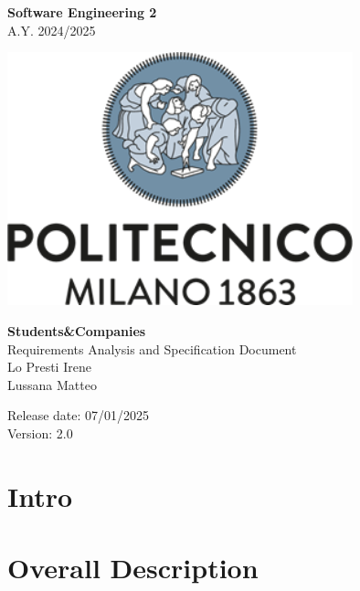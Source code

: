 \documentclass{config/PoliMi3i_thesis}
\numberwithin{algorithm}{chapter}
\begin{document}
%
\fancyhf{} %
\fancyhead[RO,RE]{\thepage} %

\begin{titlepage}

\centering
{\bfseries\LARGE Software Engineering 2\\ 
\vskip0.2cm
}
 \large A.Y. 2024/2025


\vskip1.5cm


\includegraphics[width=10cm]{Images/logopoliazzurro.png}\centering
\vskip2cm

     
\centering
{\bfseries \Huge Students\&Companies\\
\vskip0.5cm
}
\huge Requirements Analysis and Specification Document\\
\vskip1.5cm
{\Large 
            Lo Presti Irene\\ 
            Lussana Matteo\\
}

\vskip2cm
\raggedright\large{
 Release date: 07/01/2025\\
 Version: 2.0}


\end{titlepage}

\pagebreak

\renewcommand*\contentsname{Table Of Contents}
\tableofcontents

\pagebreak
\chapter{Intro}


\pagebreak
\chapter{Overall Description}

\end{document}
